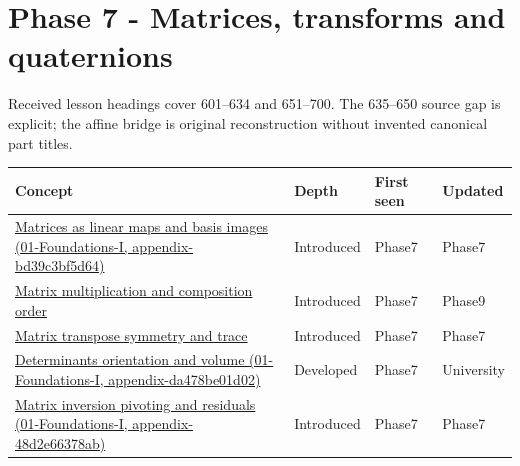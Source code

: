 \section{Phase 7 - Matrices, transforms and quaternions}\label{appendix-a6d556a4ef50-phase-7---matrices-transforms-and-quaternions}

Received lesson headings cover 601--634 and 651--700. The 635--650 source gap is explicit; the affine bridge is original reconstruction without invented canonical part titles.

{\def\LTcaptype{none} %
\begin{longtable}[]{@{}
  >{\raggedright\arraybackslash}p{}
  >{\raggedright\arraybackslash}p{}
  >{\raggedright\arraybackslash}p{}
  >{\raggedright\arraybackslash}p{}@{}}
\toprule\noalign{}
\begin{minipage}[b]{\linewidth}\raggedright
Concept
\end{minipage} & \begin{minipage}[b]{\linewidth}\raggedright
Depth
\end{minipage} & \begin{minipage}[b]{\linewidth}\raggedright
First seen
\end{minipage} & \begin{minipage}[b]{\linewidth}\raggedright
Updated
\end{minipage} \\
\midrule\noalign{}
\endhead
\bottomrule\noalign{}
\endlastfoot
\href{../01-Foundations-I/main.pdf\#nameddest=appendix-bd39c3bf5d64}{Matrices as linear maps and basis images (01-Foundations-I, appendix-bd39c3bf5d64)} & Introduced & Phase7 & Phase7 \\
\hyperref[appendix-ab31ef447dbf]{Matrix multiplication and composition order} & Introduced & Phase7 & Phase9 \\
\hyperref[appendix-175ca5ff874d]{Matrix transpose symmetry and trace} & Introduced & Phase7 & Phase7 \\
\href{../01-Foundations-I/main.pdf\#nameddest=appendix-da478be01d02}{Determinants orientation and volume (01-Foundations-I, appendix-da478be01d02)} & Developed & Phase7 & University \\
\href{../01-Foundations-I/main.pdf\#nameddest=appendix-48d2e66378ab}{Matrix inversion pivoting and residuals (01-Foundations-I, appendix-48d2e66378ab)} & Introduced & Phase7 & Phase7 \\

\end{longtable}}
